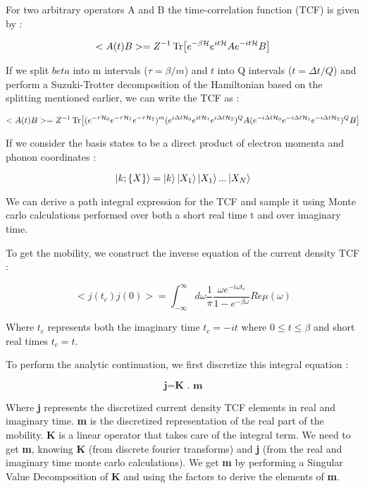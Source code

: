 For two arbitrary operators A and B the time-correlation function (TCF) is given by :

\begin{equation}
<A(t)B> = Z^{-1} \Tr[e^{-\beta \mathcal{H}} e^{it\mathcal{H}}Ae^{-it\mathcal{H}}B]
\end{equation}

If we split $beta$ into m intervals ($\tau = \beta/m$) and $t$ into Q intervals ($t= \Delta t/Q$) and perform a Suzuki-Trotter decomposition of the Hamiltonian based on the splitting mentioned earlier, we can write the TCF as :

\begin{equation}
<A(t)B> = Z^{-1} \Tr[(e^{-\tau \mathcal{H}_0}e^{-\tau \mathcal{H}_1}e^{-\tau \mathcal{H}_2})^m (e^{i\Delta t\mathcal{H}_0}e^{it\mathcal{H}_1}e^{i\Delta t\mathcal{H}_2})^QA(e^{-i \Delta t \mathcal{H}_0}e^{-i \Delta t \mathcal{H}_1}e^{-i \Delta t \mathcal{H}_2})^QB]
\end{equation}

If we consider the basis states to be a direct product of electron momenta and phonon coordinates :

\begin{equation}
    \ket{k;\{X\}} = \ket{k}\ket{X_1}\ket{X_1}...\ket{X_{N}}
\end{equation}

We can derive a path integral expression for the TCF and sample it using Monte carlo calculations performed over both a short real time t and over imaginary time.

To get the mobility, we construct the inverse equation of the current density TCF :

\begin{equation}
    <j(t_c)j(0)> = \int_{-\infty}^{\infty} d \omega \frac{1}{\pi} \frac{\omega e^{-i\omega t_c}}{1 - e^{-\beta \omega}} Re \mu(\omega)
\end{equation}

Where $t_c$ represents both the imaginary time $t_c = -it$ where $0 \leq t \leq \beta$ and short real times $t_c = t$.

To perform the analytic continuation, we first discretize this integral equation :

\begin{equation}
\textbf{j} = \textbf{K . m}
\end{equation}

Where \textbf{j} represents the discretized current density TCF elements in real and imaginary time. \textbf{m} is the discretized representation of the real part of the mobility. \textbf{K} is a linear operator that takes care of the integral term. We need to get \textbf{m}, knowing \textbf{K} (from discrete fourier transforms) and \textbf{j} (from the real and imaginary time monte carlo calculations). We get \textbf{m} by performing a Singular Value Decomposition of \textbf{K} and using the factors to derive the elements of \textbf{m}. 







